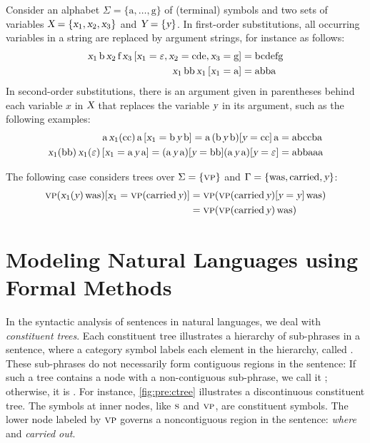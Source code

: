 \documentclass[../document.tex]{subfiles}
\begin{document}
    \begin{example}
        Consider an alphabet \(\Sigma = \{\text{a}, \ldots, \text{g}\}\) of (terminal) symbols and two sets of variables \(\textsl{X} = \{\textsl{x}_1, \textsl{x}_2, \textsl{x}_3\}\) and \(\textsl{Y} = \{\textsl{y}\}\).
        In first-order substitutions, all occurring variables in a string are replaced by argument strings, for instance as follows:
        \begin{align*}
            \textsl{x}_1 \, \text{b} \, \textsl{x}_2 \, \text{f} \, \textsl{x}_3\,[\textsl{x}_1=\varepsilon, \textsl{x}_2=\text{cde}, \textsl{x}_3=\text{g}] &= \text{bcdefg} \\
            \textsl{x}_1 \, \text{bb} \, \textsl{x}_1 \, [\textsl{x}_1=\text{a}] &= \text{abba}
        \end{align*}
        In second-order substitutions, there is an argument given in parentheses behind each variable \(x\) in \(\textsl{X}\) that replaces the variable \(\textsl{y}\) in its argument, such as the following examples:
        \begin{align*}
            \text{a} \, \textsl{x}_1(\text{cc}) \, \text{a} \, [\textsl{x}_1=\text{b}\,\textsl{y}\,\text{b}] = \text{a} \, (\text{b}\,\textsl{y}\,\text{b})[\textsl{y}=\text{cc}] \, \text{a} &= \text{abccba} \\
            \textsl{x}_1(\text{bb}) \, \textsl{x}_1(\varepsilon) \, [\textsl{x}_1=\text{a}\,\textsl{y}\,\text{a}] = (\text{a}\,\textsl{y}\,\text{a})[\textsl{y}=\text{bb}] (\text{a}\,\textsl{y}\,\text{a})[\textsl{y}=\varepsilon] &= \text{abbaaa}
        \end{align*}

        The following case considers trees over \(\Sigma=\{\textsc{vp}\}\) and \(\Gamma=\{\text{was}, \text{carried}, \textsl{y}\}\):
        \begin{align*}
            \textsc{vp}( \textsl{x}_1(\textsl{y}) \, \text{was} )[\textsl{x}_1=\textsc{vp}(\text{carried}\,\textsl{y})]
                &= \textsc{vp}( \textsc{vp}(\text{carried}\,\textsl{y})[\textsl{y}=\textsl{y}] \, \text{was} ) \\
                &= \textsc{vp}(\textsc{vp}(\text{carried}\,\textsl{y})\,\text{was})
        \end{align*}
    \end{example}

    \section{Modeling Natural Languages using Formal Methods}\label{sec:preliminaries:ctrees}
    In the syntactic analysis of sentences in natural languages, we deal with \emph{constituent trees}.
    Each constituent tree illustrates a hierarchy of sub-phrases in a sentence, where a category symbol labels each element in the hierarchy, called .
    These sub-phrases do not necessarily form contiguous regions in the sentence:
    If such a tree contains a node with a non-contiguous sub-phrase, we call it ; otherwise, it is .
    For instance, \cref{fig:pre:ctree} illustrates a discontinuous constituent tree.
    The symbols at inner nodes, like \(\textsc{s}\) and \(\textsc{vp}\), are constituent symbols.
    The lower node labeled by \(\textsc{vp}\) governs a noncontiguous region in the sentence: \emph{where} and \emph{carried out}.
\end{document}
